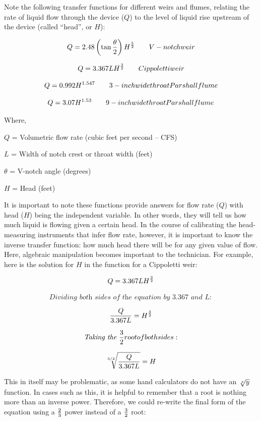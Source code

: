 \filbreak

Note the following transfer functions for different weirs and flumes, relating the rate of liquid flow through the device ($Q$) to the level of liquid rise upstream of the device (called ``head'', or $H$):

\vskip 10pt

$$Q = 2.48 \left( \tan {\theta \over 2} \right) H^{5 \over 2} {\hskip 20pt V-notch weir}$$

\vskip 10pt

$$Q = 3.367 L H^{3 \over 2} {\hskip 20pt Cippoletti weir}$$

\vskip 10pt

$$Q = 0.992 H^{1.547} {\hskip 20pt 3-inch wide throat Parshall flume}$$

\vskip 10pt

$$Q = 3.07 H^{1.53} {\hskip 20pt 9-inch wide throat Parshall flume}$$

\vskip 10pt

\noindent
Where,

$Q$ = Volumetric flow rate (cubic feet per second -- CFS)

$L$ = Width of notch crest or throat width (feet)

$\theta$ = V-notch angle (degrees)

$H$ = Head (feet)

\vskip 10pt

It is important to note these functions provide answers for flow rate ($Q$) with head ($H$) being the independent variable.  In other words, they will tell us how much liquid is flowing given a certain head.  In the course of calibrating the head-measuring instruments that infer flow rate, however, it is important to know the inverse transfer function: how much head there will be for any given value of flow.  Here, algebraic manipulation becomes important to the technician.  For example, here is the solution for $H$ in the function for a Cippoletti weir: 

$$Q = 3.367 L H^{3 \over 2}$$

$$\textit{Dividing both sides of the equation by 3.367 and }L {:}$$

$${Q \over 3.367 L} =  H^{3 \over 2}$$

$$\textit{Taking the } {3 \over 2} { root of both sides:}$$

$$\root {3 / 2} \of {Q \over 3.367 L} =  H$$

\filbreak

This in itself may be problematic, as some hand calculators do not have an $\root x \of y$ function.  In cases such as this, it is helpful to remember that a root is nothing more than an inverse power.  Therefore, we could re-write the final form of the equation using a $2 \over 3$ power instead of a $3 \over 2$ root:  


